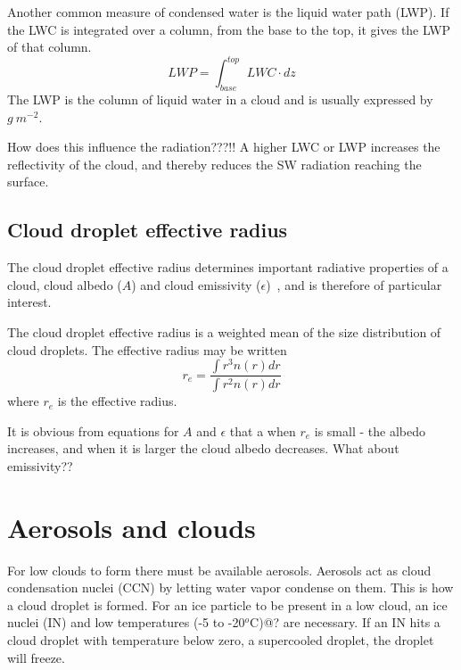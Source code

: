 Another common measure of condensed water is the liquid water path (LWP).
If the LWC is integrated over a column, from the base to the top, it gives the LWP of that column.
\begin{equation}
LWP = \int_{base}^{top} LWC \cdot dz
\end{equation}
The LWP is the column of liquid water in a cloud and is usually expressed by $g~m^{-2}$.

How does this influence the radiation???!!
A higher LWC or LWP increases the reflectivity of the cloud, and thereby reduces the SW radiation reaching the surface.

\subsection{Cloud droplet effective radius}
The cloud droplet effective radius determines important radiative properties of a cloud, cloud albedo ($A$) and cloud emissivity ($\epsilon$)~\citep{Hansen1974}, and is therefore of particular interest.

The cloud droplet effective radius is a weighted mean of the size distribution of cloud droplets. The effective radius may be written
\begin{equation}
r_e = \frac{\int r^3 n(r) dr}{\int r^2 n(r) dr}
\end{equation}
where $r_e$ is the effective radius.

It is obvious from equations for $A$ and $\epsilon$ that a when $r_e$ is small - the albedo increases, and when it is larger the cloud albedo decreases. What about emissivity??






\section{Aerosols and clouds}%
For low clouds to form there must be available aerosols. Aerosols act as cloud condensation nuclei (CCN) by letting water vapor condense on them. This is how a cloud droplet is formed. For an ice particle to be present in a low cloud, an ice nuclei (IN) and low temperatures (-5 to -20$^o$C)@? are necessary. If an IN hits a cloud droplet with temperature below zero, a supercooled droplet, the droplet will freeze.

